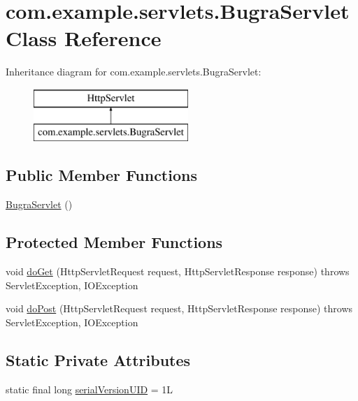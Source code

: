 \hypertarget{classcom_1_1example_1_1servlets_1_1_bugra_servlet}{}\section{com.\+example.\+servlets.\+Bugra\+Servlet Class Reference}
\label{classcom_1_1example_1_1servlets_1_1_bugra_servlet}
Inheritance diagram for com.\+example.\+servlets.\+Bugra\+Servlet\+:\begin{figure}[H]
\begin{center}
\leavevmode
\includegraphics[height=2.000000cm]{classcom_1_1example_1_1servlets_1_1_bugra_servlet}
\end{center}
\end{figure}
\subsection*{Public Member Functions}
\begin{DoxyCompactItemize}
\item 
\hyperlink{classcom_1_1example_1_1servlets_1_1_bugra_servlet_a99bb8aae42b1719184ea8c7d9fee9030}{Bugra\+Servlet} ()
\end{DoxyCompactItemize}
\subsection*{Protected Member Functions}
\begin{DoxyCompactItemize}
\item 
void \hyperlink{classcom_1_1example_1_1servlets_1_1_bugra_servlet_a0874481d6101ca58a052edeb9ce9a815}{do\+Get} (Http\+Servlet\+Request request, Http\+Servlet\+Response response)  throws Servlet\+Exception, I\+O\+Exception 
\item 
void \hyperlink{classcom_1_1example_1_1servlets_1_1_bugra_servlet_a049250502b8d42e00612a0e249b8e3e2}{do\+Post} (Http\+Servlet\+Request request, Http\+Servlet\+Response response)  throws Servlet\+Exception, I\+O\+Exception 
\end{DoxyCompactItemize}
\subsection*{Static Private Attributes}
\begin{DoxyCompactItemize}
\item 
static final long \hyperlink{classcom_1_1example_1_1servlets_1_1_bugra_servlet_a017b832dab85959c1a172b508ce28716}{serial\+Version\+U\+ID} = 1L
\end{DoxyCompactItemize}


